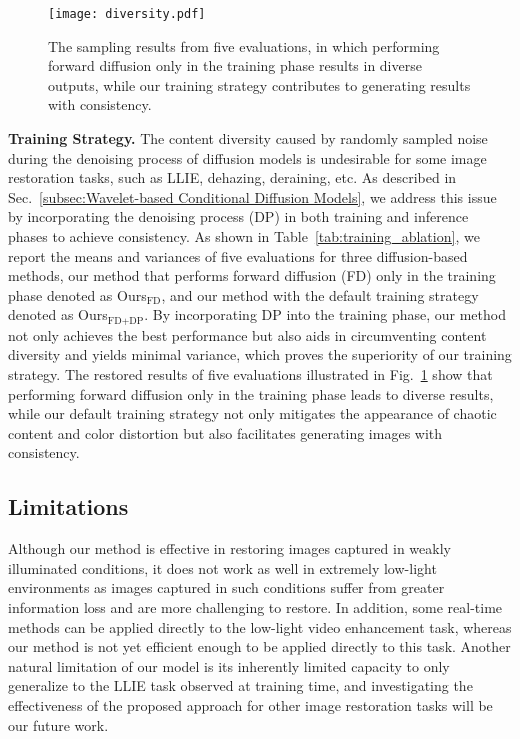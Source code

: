 \begin{figure}[!t]
	\centering
	\texttt{[image: diversity.pdf]}
	\caption{The sampling results from five evaluations, in which performing forward diffusion only in the training phase results in diverse outputs, while our training strategy contributes to generating results with consistency.}
	\label{fig:diversity}
\end{figure}

\textbf{Training Strategy.}
The content diversity caused by randomly sampled noise during the denoising process of diffusion models is undesirable for some image restoration tasks, such as LLIE, dehazing, deraining, etc. As described in Sec.~\ref{subsec:Wavelet-based Conditional Diffusion Models}, we address this issue by incorporating the denoising process (DP) in both training and inference phases to achieve consistency. As shown in Table~\ref{tab:training_ablation}, we report the means and variances of five evaluations for three diffusion-based methods, our method that performs forward diffusion (FD) only in the training phase denoted as Ours$_{\operatorname{FD}}$, and our method with the default training strategy denoted as Ours$_{\operatorname{FD+DP}}$. By incorporating DP into the training phase, our method not only achieves the best performance but also aids in circumventing content diversity and yields minimal variance, which proves the superiority of our training strategy. The restored results of five evaluations illustrated in Fig.~\ref{fig:diversity} show that performing forward diffusion only in the training phase leads to diverse results, while our default training strategy not only mitigates the appearance of chaotic content and color distortion but also facilitates generating images with consistency.

\subsection{Limitations}
Although our method is effective in restoring images captured in weakly illuminated conditions, it does not work as well in extremely low-light environments as images captured in such conditions suffer from greater information loss and are more challenging to restore. In addition, some real-time methods can be applied directly to the low-light video enhancement task, whereas our method is not yet efficient enough to be applied directly to this task. Another natural limitation of our model is its inherently limited capacity to only generalize to the LLIE task observed at training time, and investigating the effectiveness of the proposed approach for other image restoration tasks will be our future work.

